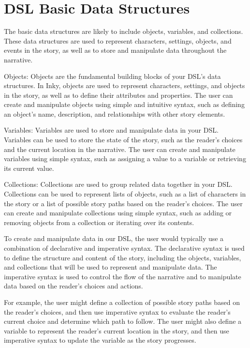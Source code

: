 \section{DSL Basic Data Structures}

The basic data structures are likely to include objects, variables, and collections. These data structures are used to represent characters, settings, objects, and events in the story, as well as to store and manipulate data throughout the narrative.

Objects: Objects are the fundamental building blocks of your DSL's data structures. In Inky, objects are used to represent characters, settings, and objects in the story, as well as to define their attributes and properties. The user can create and manipulate objects using simple and intuitive syntax, such as defining an object's name, description, and relationships with other story elements.

Variables: Variables are used to store and manipulate data in your DSL. Variables can be used to store the state of the story, such as the reader's choices and the current location in the narrative. The user can create and manipulate variables using simple syntax, such as assigning a value to a variable or retrieving its current value.

Collections: Collections are used to group related data together in your DSL. Collections can be used to represent lists of objects, such as a list of characters in the story or a list of possible story paths based on the reader's choices. The user can create and manipulate collections using simple syntax, such as adding or removing objects from a collection or iterating over its contents.

To create and manipulate data in our DSL, the user would typically use a combination of declarative and imperative syntax. The declarative syntax is used to define the structure and content of the story, including the objects, variables, and collections that will be used to represent and manipulate data. The imperative syntax is used to control the flow of the narrative and to manipulate data based on the reader's choices and actions.

For example, the user might define a collection of possible story paths based on the reader's choices, and then use imperative syntax to evaluate the reader's current choice and determine which path to follow. The user might also define a variable to represent the reader's current location in the story, and then use imperative syntax to update the variable as the story progresses.

